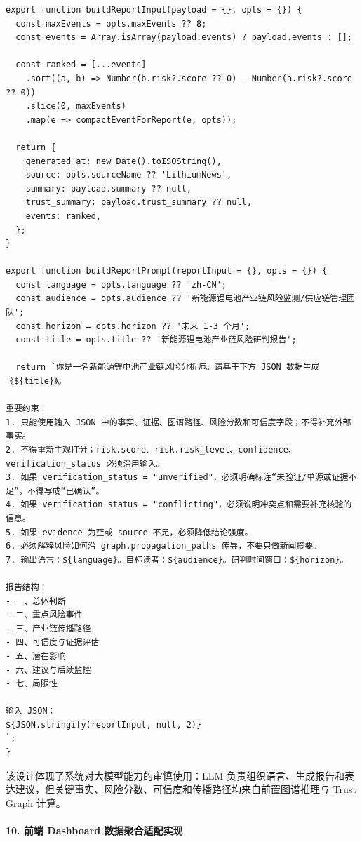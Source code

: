 \documentclass[12pt,a4paper]{article}
\begin{document}
\begin{lstlisting}[style=projectcode,caption={结构化证据约束下的 LLM 研判报告 Prompt 构造}]
export function buildReportInput(payload = {}, opts = {}) {
  const maxEvents = opts.maxEvents ?? 8;
  const events = Array.isArray(payload.events) ? payload.events : [];

  const ranked = [...events]
    .sort((a, b) => Number(b.risk?.score ?? 0) - Number(a.risk?.score ?? 0))
    .slice(0, maxEvents)
    .map(e => compactEventForReport(e, opts));

  return {
    generated_at: new Date().toISOString(),
    source: opts.sourceName ?? 'LithiumNews',
    summary: payload.summary ?? null,
    trust_summary: payload.trust_summary ?? null,
    events: ranked,
  };
}

export function buildReportPrompt(reportInput = {}, opts = {}) {
  const language = opts.language ?? 'zh-CN';
  const audience = opts.audience ?? '新能源锂电池产业链风险监测/供应链管理团队';
  const horizon = opts.horizon ?? '未来 1-3 个月';
  const title = opts.title ?? '新能源锂电池产业链风险研判报告';

  return `你是一名新能源锂电池产业链风险分析师。请基于下方 JSON 数据生成《${title}》。

重要约束：
1. 只能使用输入 JSON 中的事实、证据、图谱路径、风险分数和可信度字段；不得补充外部事实。
2. 不得重新主观打分；risk.score、risk.risk_level、confidence、verification_status 必须沿用输入。
3. 如果 verification_status = "unverified"，必须明确标注“未验证/单源或证据不足”，不得写成“已确认”。
4. 如果 verification_status = "conflicting"，必须说明冲突点和需要补充核验的信息。
5. 如果 evidence 为空或 source 不足，必须降低结论强度。
6. 必须解释风险如何沿 graph.propagation_paths 传导，不要只做新闻摘要。
7. 输出语言：${language}。目标读者：${audience}。研判时间窗口：${horizon}。

报告结构：
- 一、总体判断
- 二、重点风险事件
- 三、产业链传播路径
- 四、可信度与证据评估
- 五、潜在影响
- 六、建议与后续监控
- 七、局限性

输入 JSON：
${JSON.stringify(reportInput, null, 2)}
`;
}
\end{lstlisting}

该设计体现了系统对大模型能力的审慎使用：LLM 负责组织语言、生成报告和表达建议，但关键事实、风险分数、可信度和传播路径均来自前置图谱推理与 Trust Graph 计算。

\paragraph{10. 前端 Dashboard 数据聚合适配实现}
\end{document}
